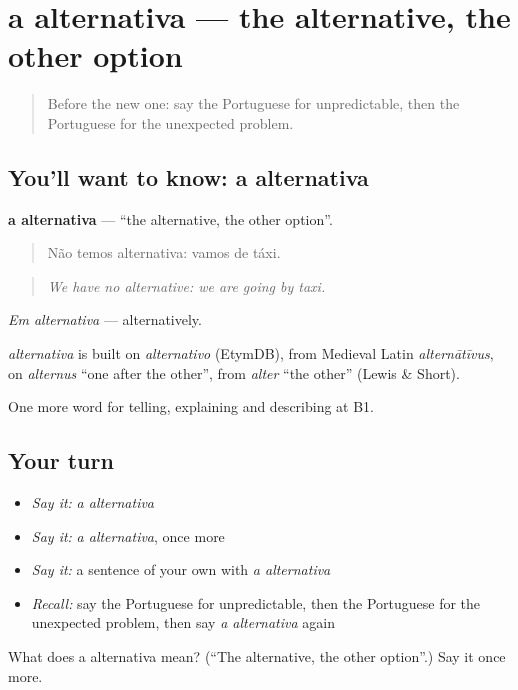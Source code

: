 \section[a alternativa]{a alternativa — the alternative, the other option}

\label{lesson:PT-C371-alternativa}



\begin{quote}
Before the new one: say the Portuguese for unpredictable, then the Portuguese for the unexpected problem.
\end{quote}

\subsection*{You'll want to know: a alternativa}
\textbf{a alternativa} — \textquotedblleft{}the alternative, the other option\textquotedblright{}.

\begin{quote}
Não temos alternativa: vamos de táxi.
\end{quote}

\begin{quote}
\emph{We have no alternative: we are going by taxi.}
\end{quote}

\emph{Em alternativa} — alternatively.

\begin{cousinweb}
\emph{alternativa} is built on \emph{alternativo} (EtymDB), from Medieval Latin \emph{alternātīvus}, on \emph{alternus} \textquotedblleft{}one after the other\textquotedblright{}, from \emph{alter} \textquotedblleft{}the other\textquotedblright{} (Lewis \& Short).
\end{cousinweb}

\begin{grammarlens}[title={What you've built}]
One more word for telling, explaining and describing at B1.
\end{grammarlens}

\subsection*{Your turn}
\begin{itemize}
\raggedright
  \item \emph{Say it:} \emph{a alternativa}
  \item \emph{Say it:} \emph{a alternativa}, once more
  \item \emph{Say it:} a sentence of your own with \emph{a alternativa}
  \item \emph{Recall:} say the Portuguese for unpredictable, then the Portuguese for the unexpected problem, then say \emph{a alternativa} again
\end{itemize}

\begin{tcolorbox}[breakable,colback=teal!4,colframe=teal!35!black,title={Before you move on}]
What does a alternativa mean? (\textquotedblleft{}The alternative, the other option\textquotedblright{}.) Say it once more.
\end{tcolorbox}
